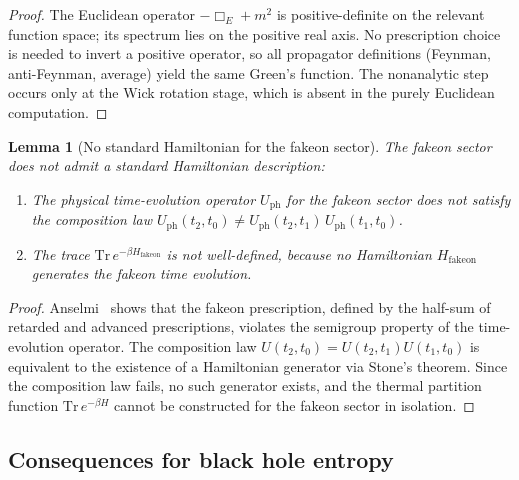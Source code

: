 \documentclass[11pt,a4paper]{article}
\theoremstyle{plain}
\newtheorem{lemma}[theorem]{Lemma}
\theoremstyle{definition}
\begin{document}
\begin{proof}
  The Euclidean operator $-\Box_E + m^2$ is positive-definite on the
  relevant function space; its spectrum lies on the positive real axis.
  No prescription choice is needed to invert a positive operator, so
  all propagator definitions (Feynman, anti-Feynman, average) yield
  the same Green's function.  The nonanalytic step occurs only at the
  Wick rotation stage, which is absent in the purely Euclidean
  computation.
\end{proof}

\begin{lemma}[No standard Hamiltonian for the fakeon sector]%
\label{lem:no_hamiltonian}
  The fakeon sector does not admit a standard Hamiltonian description:
  \begin{enumerate}[label=\textup{(\alph*)}]
    \item The physical time-evolution operator $U_{\mathrm{ph}}$ for the
      fakeon sector does not satisfy the composition law
      $U_{\mathrm{ph}}(t_2, t_0)
       \neq U_{\mathrm{ph}}(t_2, t_1) \, U_{\mathrm{ph}}(t_1, t_0)$.
    \item The trace $\mathrm{Tr}\,e^{-\beta H_{\mathrm{fakeon}}}$ is
      not well-defined, because no Hamiltonian
      $H_{\mathrm{fakeon}}$ generates the fakeon time evolution.
  \end{enumerate}
\end{lemma}

\begin{proof}
  Anselmi~\cite{Anselmi2023interval} shows that the fakeon
  prescription, defined by the half-sum of retarded and advanced
  prescriptions, violates the semigroup property of the time-evolution
  operator.  The composition law $U(t_2,t_0) = U(t_2,t_1)U(t_1,t_0)$
  is equivalent to the existence of a Hamiltonian generator via
  Stone's theorem.  Since the composition law fails, no such generator
  exists, and the thermal partition function
  $\mathrm{Tr}\,e^{-\beta H}$ cannot be constructed for the
  fakeon sector in isolation.
\end{proof}

\subsection{Consequences for black hole entropy}%
\label{sec:fakeon_bh_entropy}
\end{document}
